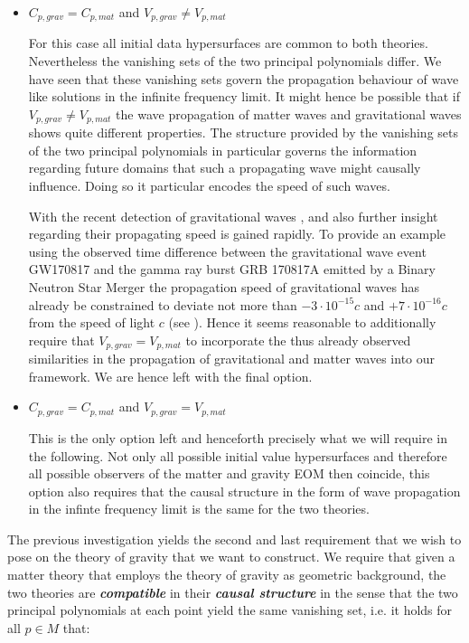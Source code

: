 \documentclass[a4paper,12pt, DIV=14, BCOR=5mm, twoside, headsepline]{scrbook}
\begin{document}
\begin{itemize}
\item $C_{p,grav} = C_{p,mat}$ and $V_{p,grav} \neq V_{p,mat}$ 

For this case all initial data hypersurfaces are common to both theories. Nevertheless the vanishing sets of the two principal polynomials differ. We have seen that these vanishing sets govern the propagation behaviour of wave like solutions in the infinite frequency limit. It might hence be possible that if $V_{p,grav} \neq V_{p,mat}$ the wave propagation of matter waves and gravitational waves shows quite different properties. The structure provided by the vanishing sets of the two principal polynomials in particular governs the information regarding future domains that such a propagating wave might causally influence. Doing so it particular encodes the speed of such waves. 

With the recent detection of gravitational waves \cite{2017ApJ...848L..12A}, \cite{2017PhRvL.119n1101A} and \cite{2016PhRvL.116f1102A} also further insight regarding their propagating speed is gained rapidly. 
To provide an example using the observed time difference between the gravitational wave event GW170817 and the gamma ray burst GRB 170817A emitted by a Binary Neutron Star Merger the propagation speed of gravitational waves has already be constrained to deviate not more than $-3\cdot 10^{{-}15}c$ and $+7\cdot 10^{{-}16}c$ from the speed of light $c$ (see \cite{2017ApJ...848L..13A}). Hence it seems reasonable to additionally require that $V_{p,grav} = V_{p,mat}$ to incorporate the thus already observed similarities in the propagation of gravitational and matter waves into our framework. We are hence left with the final option.
\item $C_{p,grav} = C_{p,mat}$ and $V_{p,grav} = V_{p,mat}$ 

This is the only option left and henceforth precisely what we will require in the following. Not only all possible initial value hypersurfaces and therefore all possible observers of the matter and gravity EOM then coincide, this option also requires that the causal structure in the form of wave propagation in the infinte frequency limit is the same for the two theories.  
\end{itemize}
The previous investigation yields the second and last requirement that we wish to pose on the theory of gravity that we want to construct. We require that given a matter theory that employs the theory of gravity as geometric background, the two theories are \textit{\textbf{compatible}} in their \textit{\textbf{causal structure}} in the sense that the two principal polynomials at each point yield the same vanishing set, i.e. it holds for all $p \in M$ that: 
\end{document}
